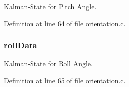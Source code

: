 Kalman-\/\-State for Pitch Angle. 



Definition at line 64 of file orientation.\-c.

\hypertarget{group__orientation_ga327c51463b7ca66c1ed8d0f400ffbfec}{
\subsubsection[{roll\-Data}]{ roll\-Data}}\label{group__orientation_ga327c51463b7ca66c1ed8d0f400ffbfec}


Kalman-\/\-State for Roll Angle. 



Definition at line 65 of file orientation.\-c.

